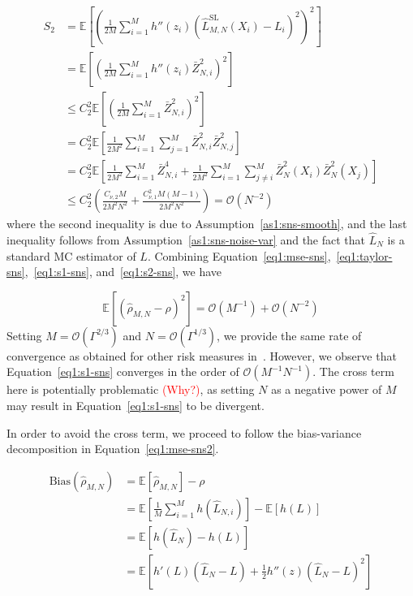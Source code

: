 \begin{align} \label{eq1:s2-sns}
    S_2 & = \mathbb{E} \left[ \left( \frac{1}{2M} \sum_{i=1}^M h''\left( z_i \right) \left( \hat{L}^{\text{SL}}_{M, N}(X_i) - L_i \right)^2 \right)^2\right] \nonumber \\
    & = \mathbb{E} \left[ \left(\frac{1}{2M} \sum_{i=1}^M h''\left( z_i \right) \bar{Z}_{N, i}^2 \right)^2 \right] \nonumber \\
    & \leq C_2^2 \mathbb{E} \left[ \left(\frac{1}{2M} \sum_{i=1}^M \bar{Z}_{N, i}^2 \right)^2 \right] \nonumber \\
    & = C_2^2 \mathbb{E} \left[ \frac{1}{2M^2} \sum_{i=1}^M \sum_{j=1}^M \bar{Z}_{N, i}^2 \bar{Z}_{N, j}^2 \right] \nonumber \\
    & = C_2^2 \mathbb{E} \left[ \frac{1}{2M^2} \sum_{i=1}^M \bar{Z}_{N, i}^4 + \frac{1}{2M^2} \sum_{i=1}^M \sum_{j \neq i}^M \bar{Z}_N^2(X_i) \bar{Z}_N^2(X_j) \right] \nonumber \\
    & \leq  C_2^2 \left(\frac{ C_{\nu, 2} M}{2M^2N^2} + \frac{C_{\nu,1}^2M(M-1)}{2M^2N^2}\right) = \mathcal{O}(N^{-2})
\end{align}
where the second inequality is due to Assumption~\ref{as1:sns-smooth}, and the last inequality follows from Assumption~\ref{as1:sns-noise-var} and the fact that $\hat{L}_N$ is a standard MC estimator of $L$.
Combining Equation~\ref{eq1:mse-sns},~\ref{eq1:taylor-sns},~\ref{eq1:s1-sns}, and~\ref{eq1:s2-sns}, we have

\begin{equation} \label{eq1:mse-sns-smooth}
    \mathbb{E} \left[ \left( \hat{\rho}_{M, N} - \rho \right)^2 \right] = \mathcal{O}(M^{-1}) + \mathcal{O}(N^{-2})
\end{equation}
Setting $M = \mathcal{O}(\Gamma^{2/3})$ and $N = \mathcal{O}(\Gamma^{1/3})$, we provide the same rate of convergence as obtained for other risk measures in~\cite{gordy2010nested}.
However, we observe that Equation~\ref{eq1:s1-sns} converges in the order of $\mathcal{O}(M^{-1}N^{-1})$.
The cross term here is potentially problematic \textcolor{red}{(Why?)}, as setting $N$ as a negative power of $M$ may result in Equation~\ref{eq1:s1-sns} to be divergent.

In order to avoid the cross term, we proceed to follow the bias-variance decomposition in Equation~\ref{eq1:mse-sns2}.

\begin{align} \label{eq1:bias-sns-smooth}
    \text{Bias}(\hat{\rho}_{M, N})
    & = \mathbb{E} \left[ \hat{\rho}_{M, N} \right] - \rho \nonumber \\
    & = \mathbb{E} \left[ \frac{1}{M} \sum_{i=1}^M h\left( \hat{L}_{N, i} \right) \right] - \mathbb{E} \left[ h\left(L \right) \right]  \nonumber \\
    & = \mathbb{E} \left[ h\left( \hat{L}_N \right) - h\left( L \right) \right] \nonumber \\
    & = \mathbb{E} \left[h'\left( L \right) \left( \hat{L}_N - L \right) + \frac{1}{2} h''\left( z \right) \left( \hat{L}_N - L \right)^2 \right]
\end{align}

